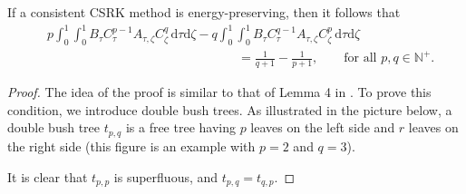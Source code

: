 \documentclass[final,leqno,onefignum,onetabnum]{siamltex1213}
\begin{document}
\begin{lemma}
If a consistent CSRK method is energy-preserving,
then it follows that
\begin{align}\label{eq:coscond1}
&p\int_0^1\int_0^1
B_\tau C_\tau ^{p-1} A_{\tau,\zeta} C_\zeta ^{q}
\,{\mathrm d} \tau {\mathrm d} \zeta
-
q\int_0^1\int_0^1
B_\tau C_\tau ^{q-1} A_{\tau,\zeta} C_\zeta ^{p}
\,{\mathrm d} \tau {\mathrm d} \zeta \\
&\hspace{15em}=
\frac{1}{q+1} - \frac{1}{p+1},
\qquad \text{for all } p,q\in\mathbb{N}^+. \nonumber
\end{align}
\end{lemma}

\begin{proof}
The idea of the proof is similar to that of Lemma 4 in \cite{cos14}.
To prove this condition, we introduce double bush trees.
As illustrated in the picture below,
a double bush tree $t_{p,q}$ is a free tree having
$p$ leaves on the left side and $r$ leaves on the right side
(this figure is an example with $p=2$ and $q=3$).

\begin{center}
\end{center}
It is clear that $t_{p,p}$ is superfluous, and $t_{p,q}=t_{q,p}$.


\end{proof}
\end{document}
